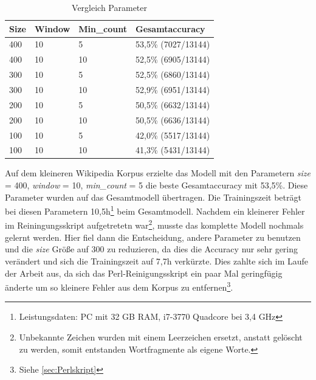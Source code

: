 \documentclass[12pt,a4paper]{report}
\begin{document}
\begin{table}[h]
\label{tab:VergleichParameter}
\caption{Vergleich Parameter}
\begin{center}
\begin{tabular}{l|l|l|l}
\textbf{Size} & \textbf{Window} & \textbf{Min\_count} & \textbf{Gesamtaccuracy}\\
\hline	
400 & 10 &  5 & 53,5\% (7027/13144)\\
400 & 10 & 10 & 52,5\% (6905/13144)\\
300 & 10 &  5 & 52,5\% (6860/13144)\\
300 & 10 & 10 & 52,9\% (6951/13144)\\
200 & 10 &  5 & 50,5\% (6632/13144)\\
200 & 10 & 10 & 50,5\% (6636/13144)\\
100 & 10 &  5 & 42,0\% (5517/13144)\\
100 & 10 & 10 & 41,3\% (5431/13144)\\

\end{tabular}
\end{center}
\end{table}

Auf dem kleineren Wikipedia Korpus erzielte das Modell mit den Parametern 
\textit{size} = 400, \textit{window} = 10, \textit{min\_count} = 5
 die beste Gesamtaccuracy mit 53,5\%. Diese Parameter wurden auf das Gesamtmodell übertragen. Die Trainingszeit beträgt bei diesen Parametern 10,5h\footnote{Leistungsdaten: PC mit 32 GB RAM, i7-3770 Quadcore bei 3,4 GHz} beim Gesamtmodell. Nachdem ein kleinerer Fehler im Reiningungsskript aufgetretetn war\footnote{Unbekannte Zeichen wurden mit einem Leerzeichen ersetzt, anstatt gelöscht zu werden, somit entstanden Wortfragmente als eigene Worte.}, musste das komplette Modell nochmals gelernt werden. Hier fiel dann die Entscheidung, andere Parameter zu benutzen und die \textit{size} Größe auf 300 zu reduzieren, da dies die Accuracy nur sehr gering verändert und sich die Trainingszeit auf 7,7h verkürzte. Dies zahlte sich im Laufe der Arbeit aus, da sich das Perl-Reinigungsskript ein paar Mal geringfügig änderte um so kleinere Fehler aus dem Korpus zu entfernen\footnote{Siehe \ref{sec:Perlskript}}.\\


	
\end{document}
